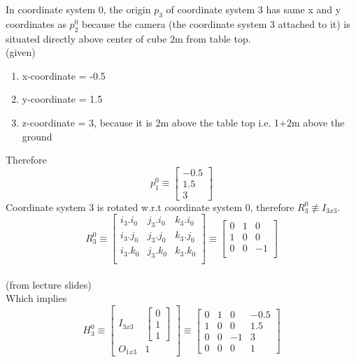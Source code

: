 \documentclass[12pt]{article}
\newcommand{\fromslides}{{\\ \color{blue} \hspace*{\fill}(from lecture slides)} \\}
\newcommand{\given}{{\\ \color{blue} \hspace*{\fill}(given)} \\}
\begin{document}
In coordinate system 0, the origin $ p_{3} $ of coordinate system 3 has same x and y coordinates as $ p_{2}^{0} $ because the camera (the coordinate system 3 attached to it) is situated directly above center of cube 2m from table top.
\given
\begin{enumerate}[nolistsep]
  \item x-coordinate = -0.5
  \item y-coordinate = 1.5
  \item z-coordinate = 3, because it is 2m above the table top i.e. 1+2m above the ground
\end{enumerate}
Therefore
\[
  p_{1}^{0} \equiv \begin{bmatrix} -0.5 \\ 1.5 \\ 3 \end{bmatrix}
\]
Coordinate system 3 is rotated w.r.t coordinate system 0, therefore $ R_{3}^{0} \not\equiv I_{3x3} $.
\[
  R_{3}^{0}
  \equiv \begin{bmatrix}
        i_3.i_0 & j_3.i_0 & k_3.i_0\\
        i_3.j_0 & j_3.j_0 & k_3.j_0\\
        i_3.k_0 & j_3.k_0 & k_3.k_0\\
        \end{bmatrix}
  \equiv \begin{bmatrix}
        0 & 1 & 0\\
        1 & 0 & 0\\
        0 & 0 & -1\\
        \end{bmatrix}
\]
\fromslides

Which implies
\[
  H_{3}^{0}
  \equiv \begin{bmatrix} I_{3x3} & \begin{bmatrix} 0 \\ 1 \\ 1 \end{bmatrix} \\ O_{1x3} & 1 \end{bmatrix}
  \equiv \begin{bmatrix}
          0 & 1 & 0 & -0.5\\
          1 & 0 & 0 & 1.5\\
          0 & 0 & -1 & 3\\
          0 & 0 & 0 & 1
        \end{bmatrix}
\]

\subsection{}
\end{document}
